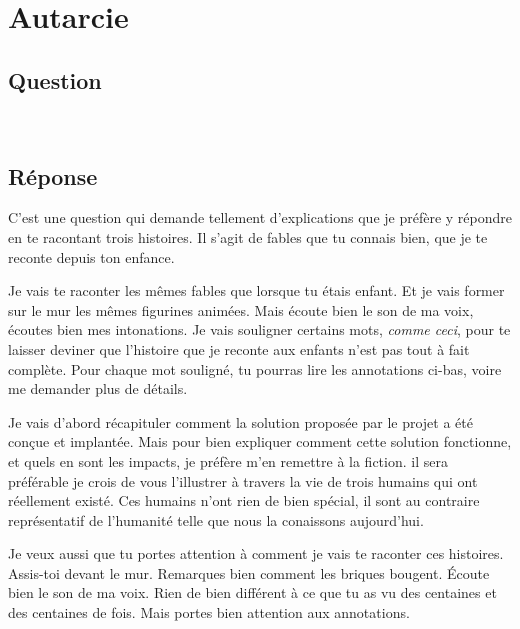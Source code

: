 \chapter{Autarcie}

\section*{Question}

\noindent\colorbox{gray!30}{}\\

\section*{Réponse}


C'est une question qui demande tellement d'explications que je préfère y
répondre en te racontant trois histoires. Il s'agit de fables que tu connais bien,
que je te reconte depuis ton enfance.



Je vais te raconter les mêmes fables que lorsque tu étais enfant.  Et je vais
former sur le mur les mêmes figurines animées.  Mais écoute bien le son de ma
voix, écoutes bien mes intonations.  Je vais souligner certains mots,
\textit{comme ceci}, pour te laisser deviner que l'histoire que je reconte aux
enfants n'est pas tout à fait complète.  Pour chaque mot souligné, tu pourras
lire les annotations ci-bas, voire me demander plus de détails.

\colorbox{gray!30}{}

Je vais d'abord récapituler comment la solution proposée par le projet
\nomProjet{} a été conçue et implantée.  Mais pour bien expliquer comment cette
solution fonctionne, et quels en sont les impacts, je préfère m'en remettre à
la fiction.  il sera préférable je crois de vous l'illustrer à travers la vie
de trois humains qui ont réellement existé. Ces humains n'ont rien de bien
spécial, il sont au contraire représentatif de l'humanité telle que nous la
conaissons aujourd'hui.

Je veux aussi que tu portes attention à comment je vais te raconter ces histoires.
Assis-toi devant le mur. Remarques bien comment les briques bougent.
Écoute bien le son de ma voix.
Rien de bien différent à ce que tu as vu des centaines et des centaines de fois.
Mais portes bien attention aux annotations.


